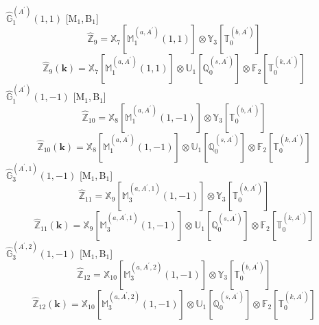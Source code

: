 \documentclass[fleqn,10pt,landscape]{article}
\begin{document}
\begin{itemize}
\noindent {} $\,\,\,\hat{\mathbb{G}}_{1}^{(A^{\prime})}(1,1)$ [M$_{1}$,\,B$_{1}$]
\begin{dmath*}
\hat{\mathbb{Z}}_{9}=\mathbb{X}_{7}[\mathbb{M}_{1}^{(a,A^{\prime})}(1,1)] \otimes\mathbb{Y}_{3}[\mathbb{T}_{0}^{(b,A^{\prime})}]
\end{dmath*}
\begin{dmath*}
\hat{\mathbb{Z}}_{9}(\bm{k})=\mathbb{X}_{7}[\mathbb{M}_{1}^{(a,A^{\prime})}(1,1)] \otimes\mathbb{U}_{1}[\mathbb{Q}_{0}^{(s,A^{\prime})}] \otimes\mathbb{F}_{2}[\mathbb{T}_{0}^{(k,A^{\prime})}]
\end{dmath*}
\vspace{4mm}
\noindent {} $\,\,\,\hat{\mathbb{G}}_{1}^{(A^{\prime})}(1,-1)$ [M$_{1}$,\,B$_{1}$]
\begin{dmath*}
\hat{\mathbb{Z}}_{10}=\mathbb{X}_{8}[\mathbb{M}_{1}^{(a,A^{\prime})}(1,-1)] \otimes\mathbb{Y}_{3}[\mathbb{T}_{0}^{(b,A^{\prime})}]
\end{dmath*}
\begin{dmath*}
\hat{\mathbb{Z}}_{10}(\bm{k})=\mathbb{X}_{8}[\mathbb{M}_{1}^{(a,A^{\prime})}(1,-1)] \otimes\mathbb{U}_{1}[\mathbb{Q}_{0}^{(s,A^{\prime})}] \otimes\mathbb{F}_{2}[\mathbb{T}_{0}^{(k,A^{\prime})}]
\end{dmath*}
\vspace{4mm}
\noindent {} $\,\,\,\hat{\mathbb{G}}_{3}^{(A^{\prime},1)}(1,-1)$ [M$_{1}$,\,B$_{1}$]
\begin{dmath*}
\hat{\mathbb{Z}}_{11}=\mathbb{X}_{9}[\mathbb{M}_{3}^{(a,A^{\prime},1)}(1,-1)] \otimes\mathbb{Y}_{3}[\mathbb{T}_{0}^{(b,A^{\prime})}]
\end{dmath*}
\begin{dmath*}
\hat{\mathbb{Z}}_{11}(\bm{k})=\mathbb{X}_{9}[\mathbb{M}_{3}^{(a,A^{\prime},1)}(1,-1)] \otimes\mathbb{U}_{1}[\mathbb{Q}_{0}^{(s,A^{\prime})}] \otimes\mathbb{F}_{2}[\mathbb{T}_{0}^{(k,A^{\prime})}]
\end{dmath*}
\vspace{4mm}
\noindent {} $\,\,\,\hat{\mathbb{G}}_{3}^{(A^{\prime},2)}(1,-1)$ [M$_{1}$,\,B$_{1}$]
\begin{dmath*}
\hat{\mathbb{Z}}_{12}=\mathbb{X}_{10}[\mathbb{M}_{3}^{(a,A^{\prime},2)}(1,-1)] \otimes\mathbb{Y}_{3}[\mathbb{T}_{0}^{(b,A^{\prime})}]
\end{dmath*}
\begin{dmath*}
\hat{\mathbb{Z}}_{12}(\bm{k})=\mathbb{X}_{10}[\mathbb{M}_{3}^{(a,A^{\prime},2)}(1,-1)] \otimes\mathbb{U}_{1}[\mathbb{Q}_{0}^{(s,A^{\prime})}] \otimes\mathbb{F}_{2}[\mathbb{T}_{0}^{(k,A^{\prime})}]

\end{dmath*}
\end{itemize}
\end{document}
